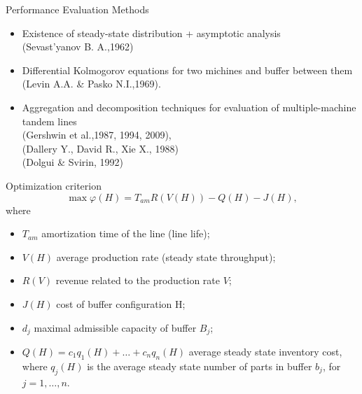 \documentclass[aspectratio=169,xcolor=dvipsnames]{beamer}
\begin{document}

\begin{frame}{Performance Evaluation Methods}
    \begin{itemize}
	\item Existence of steady-state distribution + asymptotic analysis\\
	(Sevast'yanov B. A.,1962)
	\item Differential Kolmogorov equations for two michines and buffer between them \\
	(Levin A.A. \& Pasko N.I.,1969).
	\item Aggregation and decomposition techniques for evaluation of multiple-machine tandem lines\\
	(Gershwin et al.,1987, 1994, 2009),\\
	(Dallery Y., David R., Xie X., 1988)\\
	(Dolgui \& Svirin, 1992)\\
    \end{itemize}
\end{frame}


\begin{frame}{Optimization criterion}
\begin{equation}
\label{criteria}
\max \varphi(H)=T_{am} R(V(H)) - Q(H) - J(H),
\end{equation}
where 
\begin{itemize}
\item $T_{am}$  amortization time of the line (line life); 
\item $V(H)$  average production rate (steady state throughput); 
\item $R(V)$  revenue related to the production rate $V$; 
\item $J(H)$ cost of buffer configuration H; 
\item $d_j$ maximal admissible capacity of buffer $B_j$;
\item $Q(H)= c_1q_1(H)+ …+c_n q_n(H)$ average steady state inventory cost, where $q_j(H)$ is the average steady state number of parts in buffer $b_j$, for $j=1,…,n$.
\end{itemize}
\end{frame}

\end{document}
